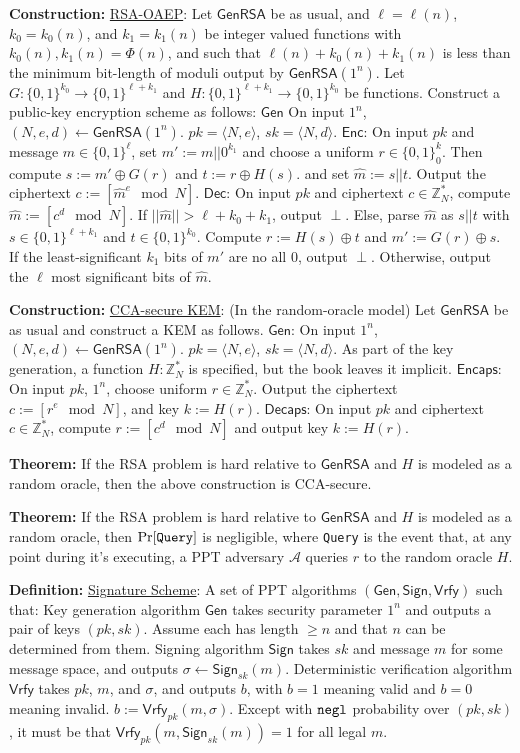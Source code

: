 \documentclass[10pt]{article}
\newcommand{\Z}{\mathbb{Z}}
\newcommand{\AAA}{\mathcal{A}}
\newcommand{\defn}[1]{{\bf Definition:} \underline{#1}}
\newcommand{\thm}[1]{{\bf Theorem:} \underline{#1}}
\newcommand{\con}[1]{{\bf Construction:} \underline{#1}}
\newcommand{\Enc}{\mathsf{Enc}}
\newcommand{\Dec}{\mathsf{Dec}}
\newcommand{\Encaps}{\mathsf{Encaps}}
\newcommand{\Decaps}{\mathsf{Decaps}}
\newcommand{\Sign}{\mathsf{Sign}}
\newcommand{\Vrfy}{\mathsf{Vrfy}}
\newcommand{\Gen}{\mathsf{Gen}}
\newcommand{\GenRSA}{\mathsf{GenRSA}}
\newcommand{\ang}[1]{\langle#1\rangle}
\newcommand{\xor}{\oplus}
\newcommand{\negl}{{\tt negl}}
\newcommand{\from}{\leftarrow}
\begin{document}
\begin{multicols}{4}
\con{RSA-OAEP}: Let $\GenRSA$ be as usual, and $\ell=\ell(n)$, $k_0=k_0(n)$, and $k_1=k_1(n)$ be integer valued functions with $k_0(n),k_1(n)=\Phi(n)$, and such that $\ell(n)+k_0(n)+k_1(n)$ is less than the minimum bit-length of moduli output by $\GenRSA(1^n)$. Let $G:\{0,1\}^{k_0}\to\{0,1\}^{\ell+k_1}$ and $H:\{0,1\}^{\ell+k_1}\to\{0,1\}^{k_0}$ be functions. Construct a public-key encryption scheme as follows: $\Gen$ On input $1^n$, $(N,e,d)\from\GenRSA(1^n)$. $pk=\ang{N,e}$, $sk=\ang{N,d}$. $\Enc$: On input $pk$ and message $m\in\{0,1\}^\ell$, set $m':=m||0^{k_1}$ and choose a uniform $r\in\{0,1\}^k_0$. Then compute $s:=m'\xor G(r)$ and $t:=r\xor H(s)$. and set $\hat{m}:=s||t$. Output the ciphertext $c:=[\hat{m}^e\mod{N}]$. $\Dec$: On input $pk$ and ciphertext $c\in\Z_N^*$, compute $\hat{m}:=[c^d\mod{N}]$. If $||\hat{m}||>\ell+k_0+k_1$, output $\perp$. Else, parse $\hat{m}$ as $s||t$ with $s\in\{0,1\}^{\ell+k_1}$ and $t\in\{0,1\}^{k_0}$. Compute $r:=H(s)\xor t$ and $m':=G(r)\xor s$. If the least-significant $k_1$ bits of $m'$ are no all $0$, output $\perp$. Otherwise, output the $\ell$ most significant bits of $\hat{m}$.

\con{CCA-secure KEM}: (In the random-oracle model) Let $\GenRSA$ be as usual and construct a KEM as follows. $\Gen$: On input $1^n$, $(N,e,d)\from\GenRSA(1^n)$. $pk=\ang{N,e}$, $sk=\ang{N,d}$. As part of the key generation, a function $H:\Z_N^*$ is specified, but the book leaves it implicit. $\Encaps$: On input $pk$, $1^n$, choose uniform $r\in\Z_N^*$. Output the ciphertext $c:=[r^e\mod{N}]$, and key $k:=H(r)$. $\Decaps$: On input $pk$ and ciphertext $c\in\Z_N^*$, compute $r:=[c^d\mod{N}]$ and output key $k:=H(r)$.

\thm{} If the RSA problem is hard relative to $\GenRSA$ and $H$ is modeled as a random oracle, then the above construction is CCA-secure.

\thm{}If the RSA problem is hard relative to $\GenRSA$ and $H$ is modeled as a random oracle, then $\Pr[{\tt Query}]$ is negligible, where {\tt Query} is the event that, at any point during it's executing, a PPT adversary $\AAA$ queries $r$ to the random oracle $H$.

\defn{Signature Scheme}: A set of PPT algorithms $(\Gen,\Sign,\Vrfy)$ such that: Key generation algorithm $\Gen$ takes security parameter $1^n$ and outputs a pair of keys $(pk,sk)$. Assume each has length $\geq n$ and that $n$ can be determined from them. Signing algorithm $\Sign$ takes $sk$ and message $m$ for some message space, and outputs $\sigma\from\Sign_{sk}(m)$. Deterministic verification algorithm $\Vrfy$ takes $pk$, $m$, and $\sigma$, and outputs $b$, with $b=1$ meaning valid and $b=0$ meaning invalid. $b:=\Vrfy_{pk}(m,\sigma)$. Except with $\negl$ probability over $(pk,sk)$, it must be that $\Vrfy_{pk}(m,\Sign_{sk}(m))=1$ for all legal $m$.


\end{multicols}
\end{document}
